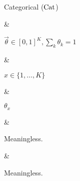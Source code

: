 Categorical ($\operatorname{Cat}$)

&

$\vec \theta \in [0, 1]^K, \sum_k \theta_k = 1$

& 

$x \in \{1, \dotsc, K\}$

&

\(\displaystyle
	\theta_x
\)

& 

Meaningless.

&

Meaningless.